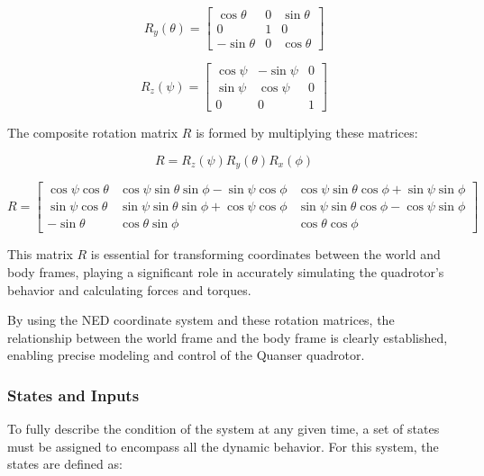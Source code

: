 \documentclass{UoNMCHA}
\numberwithin{equation}{section}
\begin{document}
    \begin{equation}
    R_y(\theta) = \begin{bmatrix}
    \cos\theta & 0 & \sin\theta \\
    0 & 1 & 0 \\
    -\sin\theta & 0 & \cos\theta
    \end{bmatrix}
    \label{eq:rotation_matrix_y}
    \end{equation}
    
    \begin{equation}
    R_z(\psi) = \begin{bmatrix}
    \cos\psi & -\sin\psi & 0 \\
    \sin\psi & \cos\psi & 0 \\
    0 & 0 & 1
    \end{bmatrix}
    \label{eq:rotation_matrix_z}
    \end{equation}
    

The composite rotation matrix \(R\) is formed by multiplying these matrices:

\begin{equation}
    R = R_z(\psi) R_y(\theta) R_x(\phi)
    \label{eq:combined_rotation_matrix}
    \end{equation}
    
    \begin{equation}
    R = \begin{bmatrix}
    \cos\psi \cos\theta & \cos\psi \sin\theta \sin\phi - \sin\psi \cos\phi & \cos\psi \sin\theta \cos\phi + \sin\psi \sin\phi \\
    \sin\psi \cos\theta & \sin\psi \sin\theta \sin\phi + \cos\psi \cos\phi & \sin\psi \sin\theta \cos\phi - \cos\psi \sin\phi \\
    -\sin\theta & \cos\theta \sin\phi & \cos\theta \cos\phi
    \end{bmatrix}
    \label{eq:expanded_rotation_matrix}
    \end{equation}
    

This matrix \(R\) is essential for transforming coordinates between the world and body frames, playing a significant role in accurately simulating the quadrotor's behavior and calculating forces and torques.

By using the NED coordinate system and these rotation matrices, the relationship between the world frame and the body frame is clearly established, enabling precise modeling and control of the Quanser quadrotor.

\subsubsection{States and Inputs}
To fully describe the condition of the system at any given time, a set of states must be assigned to encompass all the dynamic behavior. For this system, the states are defined as:
\end{document}
